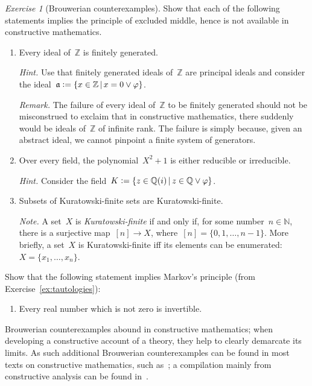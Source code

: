 \documentclass[10pt,reqno,a4paper,openany]{amsbook}
\theoremstyle{definition}
\theoremstyle{plain}
\theoremstyle{remark}
\newcommand{\ZZ}{\mathbb{Z}}
\newcommand{\NN}{\mathbb{N}}
\newcommand{\QQ}{\mathbb{Q}}
\newcommand{\aaa}{\mathfrak{a}}
\newcommand{\?}{\,{:}\,}
\renewcommand{\_}{\mathpunct{.}\,}
\newcommand{\defeq}{\vcentcolon=}
\newtheorem{exercise}[defn]{Exercise}
\begin{document}
\begin{exercise}[Brouwerian counterexamples]
Show that each of the following statements implies the principle of excluded middle,
hence is not available in constructive mathematics.
\begin{enumerate}
\item Every ideal of~$\ZZ$ is finitely generated.

{\noindent\scriptsize\emph{Hint.} Use that finitely generated ideals of~$\ZZ$
are principal ideals and consider the ideal~$\aaa \defeq \{ x \in \ZZ
\,|\, x = 0 \vee \varphi \}$.\par}

{\noindent\scriptsize\emph{Remark.} The failure of every ideal of~$\ZZ$ to be
finitely generated should not be misconstrued to exclaim that in constructive
mathematics, there suddenly would be ideals of~$\ZZ$ of infinite rank. The
failure is simply because, given an abstract ideal, we cannot pinpoint a finite
system of generators.\par}

\item Over every field, the polynomial~$X^2 + 1$ is either reducible or
irreducible.

{\noindent\scriptsize\emph{Hint.} Consider the field~$K \defeq \{ z \in \QQ(i)
\,|\, z \in \QQ \vee \varphi \}$.\par}

\item Subsets of Kuratowski-finite sets are Kuratowski-finite.

{\noindent\scriptsize\emph{Note.} A set~$X$ is \emph{Kuratowski-finite} if and
only if, for some number~$n \in \NN$, there is a surjective map~$[n] \to X$,
where~$[n] = \{ 0,1,\ldots,n-1 \}$. More briefly, a set~$X$ is
Kuratowski-finite iff its elements can be enumerated: $X = \{x_1,\ldots,x_n \}$.\par}
\end{enumerate}
Show that the following statement implies Markov's principle (from
Exercise~\ref{ex:tautologies}):
\begin{enumerate}
\addtocounter{enumi}{3}
\item Every real number which is not zero is invertible.
\end{enumerate}
\noindent
Brouwerian counterexamples abound in constructive mathematics; when developing
a constructive account of a theory, they help to clearly demarcate its limits.
As such additional Brouwerian counterexamples can be found in most texts on
constructive mathematics, such
as~\cite{mines-richman-ruitenburg:constructive-algebra}; a compilation mainly
from constructive analysis can be found
in~\cite{mandelkern:brouwerian-counterexamples}.
\end{exercise}
\end{document}
